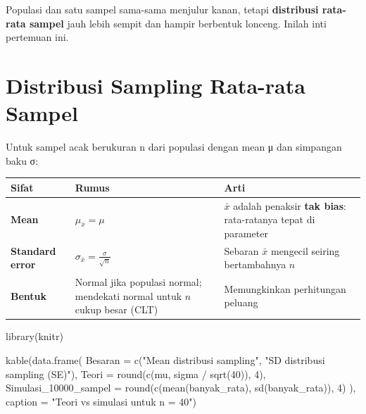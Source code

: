 \documentclass[
  indonesian,
  letterpaper,
]{book}
\newenvironment{Shaded}{\begin{snugshade}}{\end{snugshade}}
\newcommand{\AttributeTok}[1]{\textcolor[rgb]{0.40,0.45,0.13}{#1}}
\newcommand{\DecValTok}[1]{\textcolor[rgb]{0.68,0.00,0.00}{#1}}
\newcommand{\FunctionTok}[1]{\textcolor[rgb]{0.28,0.35,0.67}{#1}}
\newcommand{\NormalTok}[1]{\textcolor[rgb]{0.00,0.23,0.31}{#1}}
\newcommand{\SpecialCharTok}[1]{\textcolor[rgb]{0.37,0.37,0.37}{#1}}
\newcommand{\StringTok}[1]{\textcolor[rgb]{0.13,0.47,0.30}{#1}}
\newcounter{none} %
\begin{document}
Populasi dan satu sampel sama-sama menjulur kanan, tetapi
\textbf{distribusi rata-rata sampel} jauh lebih sempit dan hampir
berbentuk lonceng. Inilah inti pertemuan ini.

\section{Distribusi Sampling Rata-rata
Sampel}\label{distribusi-sampling-rata-rata-sampel}

Untuk sampel acak berukuran n dari populasi dengan mean μ dan simpangan
baku σ:

{\def\LTcaptype{none} %
\begin{longtable}[]{@{}
  >{\raggedright\arraybackslash}p{}
  >{\raggedright\arraybackslash}p{}
  >{\raggedright\arraybackslash}p{}@{}}
\toprule\noalign{}
\begin{minipage}[b]{\linewidth}\raggedright
Sifat
\end{minipage} & \begin{minipage}[b]{\linewidth}\raggedright
Rumus
\end{minipage} & \begin{minipage}[b]{\linewidth}\raggedright
Arti
\end{minipage} \\
\midrule\noalign{}
\endhead
\bottomrule\noalign{}
\endlastfoot
\textbf{Mean} & \(\mu_{\bar{x}} = \mu\) & \(\bar{x}\) adalah penaksir
\textbf{tak bias}: rata-ratanya tepat di parameter \\
\textbf{Standard error} & \(\sigma_{\bar{x}} = \frac{\sigma}{\sqrt{n}}\)
& Sebaran \(\bar{x}\) mengecil seiring bertambahnya \(n\) \\
\textbf{Bentuk} & Normal jika populasi normal; mendekati normal untuk
\(n\) cukup besar (CLT) & Memungkinkan perhitungan peluang \\
\end{longtable}
}

\begin{Shaded}
\begin{Highlighting}[]
\FunctionTok{library}\NormalTok{(knitr)}

\FunctionTok{kable}\NormalTok{(}\FunctionTok{data.frame}\NormalTok{(}
  \AttributeTok{Besaran =} \FunctionTok{c}\NormalTok{(}\StringTok{"Mean distribusi sampling"}\NormalTok{, }\StringTok{"SD distribusi sampling (SE)"}\NormalTok{),}
  \AttributeTok{Teori =} \FunctionTok{round}\NormalTok{(}\FunctionTok{c}\NormalTok{(mu, sigma }\SpecialCharTok{/} \FunctionTok{sqrt}\NormalTok{(}\DecValTok{40}\NormalTok{)), }\DecValTok{4}\NormalTok{),}
  \AttributeTok{Simulasi\_10000\_sampel =} \FunctionTok{round}\NormalTok{(}\FunctionTok{c}\NormalTok{(}\FunctionTok{mean}\NormalTok{(banyak\_rata), }\FunctionTok{sd}\NormalTok{(banyak\_rata)), }\DecValTok{4}\NormalTok{)}
\NormalTok{), }\AttributeTok{caption =} \StringTok{"Teori vs simulasi untuk n = 40"}\NormalTok{)}
\end{Highlighting}
\end{Shaded}
\end{document}
